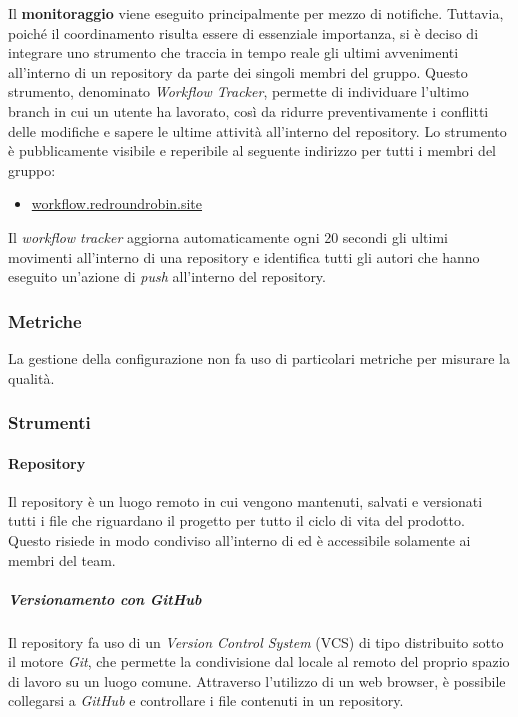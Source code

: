 	Il \textbf{monitoraggio} viene eseguito principalmente per mezzo di notifiche. Tuttavia, poiché il coordinamento risulta essere di essenziale importanza, si è deciso di integrare uno strumento che traccia in tempo reale gli ultimi avvenimenti all'interno di un repository da parte dei singoli membri del gruppo.
	Questo strumento, denominato \textit{Workflow Tracker}, permette di individuare l'ultimo branch in cui un utente ha lavorato, così da ridurre preventivamente i conflitti delle modifiche e sapere le ultime attività all'interno del repository.
	\newline
	Lo strumento è pubblicamente visibile e reperibile al seguente indirizzo per tutti i membri del gruppo:
	\begin{itemize}
		\item \href{https://workflow.redroundrobin.site}{workflow.redroundrobin.site}
	\end{itemize}
	Il \textit{workflow tracker} aggiorna automaticamente ogni 20 secondi gli ultimi movimenti all'interno di una repository e identifica tutti gli autori che hanno eseguito un'azione di \textit{push} all'interno del repository.



\subsubsection{Metriche}

La gestione della configurazione non fa uso di particolari metriche per misurare la qualità.


\subsubsection{Strumenti}

	\paragraph{Repository}
	
	Il repository è un luogo remoto in cui vengono mantenuti, salvati e versionati tutti i file che riguardano il progetto per tutto il ciclo di vita del prodotto.
	\newline
	Questo risiede in modo condiviso all'interno di  ed è accessibile solamente ai membri del team.

		\subparagraph{Versionamento con GitHub}

		Il repository fa uso di un \textit{Version Control System} (VCS) di tipo distribuito sotto il motore \textit{Git}, che permette la condivisione dal locale al remoto del proprio spazio di lavoro su un luogo comune.
		\newline
		Attraverso l'utilizzo di un web browser, è possibile collegarsi a \textit{GitHub} e controllare i file contenuti in un repository. 

